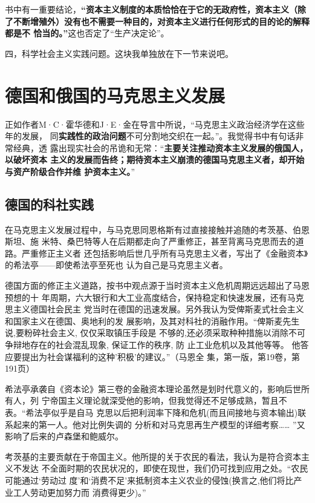 书中有一重要结论，\textbf{“资本主义制度的本质恰恰在于它的无政府性，资本主义（除
  了不断增殖外）没有也不需要一种目的，对资本主义进行任何形式的目的论的解释都是不
  恰当的。”}这也否定了“生产决定论”。

四，科学社会主义实践问题。这块我单独放在下一节来说吧。

\section{德国和俄国的马克思主义发展}

正如作者M·C·霍华德和J·E·金在导言中所说，“马克思主义政治经济学在这些年的发展，
同\textbf{实践性的政治问题}不可分割地交织在一起。”。我觉得书中有句话非常经典，透
露出现实社会的吊诡和无常：“\textbf{主要关注推动资本主义发展的俄国人，以破坏资本
  主义的发展而告终；期待资本主义崩溃的德国马克思主义者，却开始与资产阶级合作并维
  护资本主义。}”

\subsection{德国的科社实践}

在马克思主义发展过程中，与马克思同恩格斯有过直接接触并追随的考茨基、伯恩斯坦、施
米特、桑巴特等人在后期都走向了严重修正，甚至背离马克思而去的道路。严重修正主义者
还包括影响后世几乎所有马克思主义者，写出了《金融资本》的希法亭——即使希法亭至死也
认为自己是马克思主义者。

德国方面的修正主义道路，按书中观点源于当时资本主义危机周期远远超出了马恩预想的十
年周期，六大银行和大工业高度结合，保持稳定和快速发展，还有马克思主义德国社会民主
党当时在德国的迅速发展。另外我认为受俾斯麦式社会主义和国家主义在德国、奥地利的发
展影响，及其对科社的消融作用。“俾斯麦先生说,要粉碎社会主义, 仅仅采取镇压手段是
不够的,还必须采取种种措施以消除不可争辩地存在的社会混乱现象, 保证工作的秩序, 防
止工业危机以及其他等等。 他答应要提出为社会谋福利的这种'积极'的建议。”（马恩全
集，第一版，第19卷，第191页）

希法亭承袭自《资本论》第三卷的金融资本理论虽然是划时代意义的，影响后世所有人，列
宁帝国主义理论就深受他的影响，但我觉得还不足够成熟，暂且不表。“希法亭似乎是自马
克思以后把利润率下降和危机(而且间接地与资本输出)联系起来的第一人。他对比例失调的
分析和对马克思再生产模型的详细考察…… ”又影响了后来的卢森堡和鲍威尔。

考茨基的主要贡献在于帝国主义。他所提的关于农民的看法，我认为是符合资本主义不发达
不全面时期的农民状况的，即使在现世，我们仍可找到应用之处。“农民可能通过‘劳动过
度’和‘消费不足’来抵制资本主义农业的侵蚀(换言之,他们将比产业工人劳动更加努力而
消费得更少)。”

